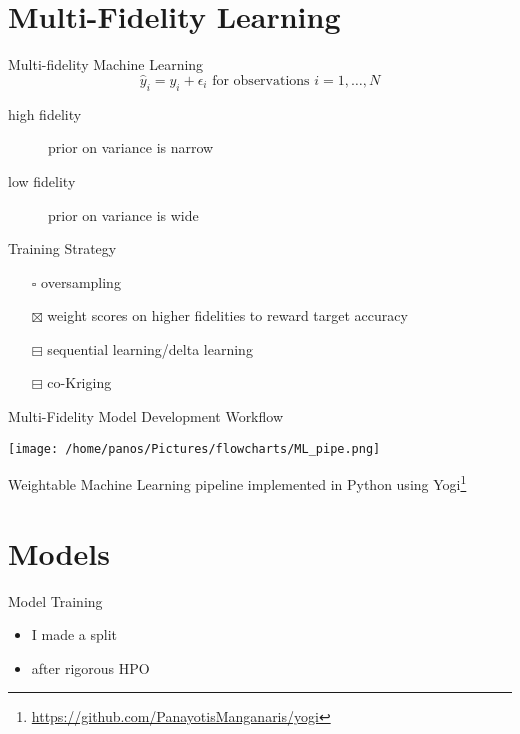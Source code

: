 \documentclass[10pt, aspectratio=169, presentation]{beamer}
\begin{document}
\section{Multi-Fidelity Learning}
\label{sec:org3ad1eb6}
\begin{frame}[label={sec:org5442454}]{Multi-fidelity Machine Learning}
\[
\hat{y}_i = y_i + \epsilon_i \mbox{ for observations } i=1,…,N
\]

\begin{description}
\item[{high fidelity}] prior on variance is narrow
\item[{low fidelity}] prior on variance is wide
\end{description}

\begin{block}{Training Strategy}
\begin{itemize}
\item[{$\square$}] oversampling
\item[{$\boxtimes$}] weight scores on higher fidelities to reward target accuracy
\item[{$\boxminus$}] sequential learning/delta learning
\item[{$\boxminus$}] co-Kriging
\end{itemize}
\end{block}
\end{frame}

\begin{frame}[label={sec:org919bdb9}]{Multi-Fidelity Model Development Workflow}
\begin{center}
\texttt{[image: /home/panos/Pictures/flowcharts/ML\_pipe.png]}
\end{center}

Weightable Machine Learning pipeline implemented in Python using Yogi\footnote{\tiny{}\url{https://github.com/PanayotisManganaris/yogi}\label{org790dce2}}
\autocite{manganaris-2022-mrs-comput}
\end{frame}

\section{Models}
\label{sec:orge1ffd8a}
\begin{frame}[label={sec:org5b333cf}]{Model Training}
\begin{itemize}
\item I made a split
\item after rigorous HPO\autocite{manganaris-2022-mrs-comput}
\end{itemize}
\end{frame}
\end{document}

